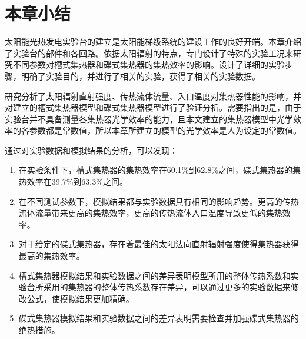 \section{本章小结}
太阳能光热发电实验台的建立是太阳能梯级系统的建设工作的良好开端。本章介绍了实验台的部件和各回路。依据太阳辐射的特点，专门设计了特殊的实验工况来研究不同参数对槽式集热器和碟式集热器的集热效率的影响。设计了详细的实验步骤，明确了实验目的，并进行了相关的实验，获得了相关的实验数据。

研究分析了太阳辐射直射强度、传热流体流量、入口温度对集热器性能的影响，并对建立的槽式集热器模型和碟式集热器模型进行了验证分析。需要指出的是，由于实验台并不具备测量各集热器光学效率的能力，且本文建立的集热器模型中光学效率的各参数都是常数值，所以本章所建立的模型的光学效率是人为设定的常数值。

通过对实验数据和模拟结果的分析，可以发现：

\begin{enumerate}[label=(\arabic*)]
\item 在实验条件下，槽式集热器的集热效率在60.1\%到62.8\%之间，碟式集热器的集热效率在39.7\%到63.3\%之间。
\item 在不同测试参数下，模拟结果都与实验数据具有相同的影响趋势。更高的传热流体流量带来更高的集热效率，更高的传热流体入口温度导致更低的集热效率。
\item 对于给定的碟式集热器，存在着最佳的太阳法向直射辐射强度使得集热器获得最高的集热效率。
\item 槽式集热器模拟结果和实验数据之间的差异表明模型所用的整体传热系数和实验台所采用的集热器的整体传热系数存在差异，可以通过更多的实验数据来修改公式，使模拟结果更加精确。
\item 碟式集热器模拟结果和实验数据之间的差异表明需要检查并加强碟式集热器的绝热措施。
\end{enumerate}